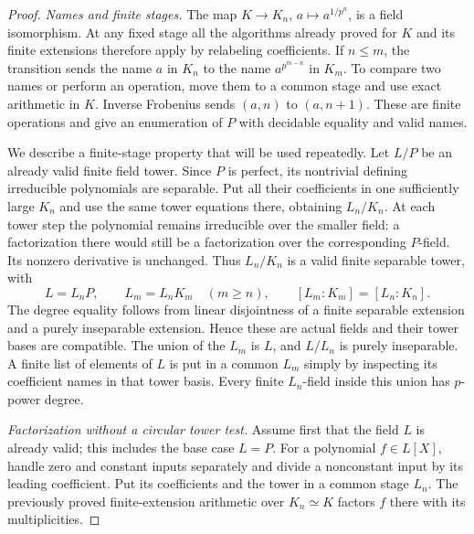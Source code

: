 \begin{proof}
\emph{Names and finite stages.}
The map $K\longrightarrow K_n$, $a\longmapsto a^{1/p^n}$, is a field
isomorphism.  At any fixed stage all the algorithms already proved
for $K$ and its finite extensions therefore apply by relabeling
coefficients.  If $n\le m$, the transition sends the name $a$ in
$K_n$ to the name $a^{p^{m-n}}$ in $K_m$.  To compare two names or
perform an operation, move them to a common stage and use exact
arithmetic in $K$.  Inverse Frobenius sends $(a,n)$ to $(a,n+1)$.
These are finite operations and give an enumeration of $P$ with
decidable equality and valid names.

We describe a finite-stage property that will be used repeatedly.
Let $L/P$ be an already valid finite field tower.  Since $P$ is
perfect, its nontrivial defining irreducible polynomials are separable.
Put all their coefficients in one sufficiently large $K_n$ and use
the same tower equations there, obtaining $L_n/K_n$.  At each tower
step the polynomial remains irreducible over the smaller field:
a factorization there would still be a factorization over the
corresponding $P$-field.  Its nonzero derivative is unchanged.
Thus $L_n/K_n$ is a valid finite separable tower, with
\[
 L=L_nP,\qquad L_m=L_nK_m\quad(m\ge n),\qquad
 [L_m:K_m]=[L_n:K_n].                                  \tag{C.3.PERF2}
\]
The degree equality follows from linear disjointness of a finite
separable extension and a purely inseparable extension.  Hence these
are actual fields and their tower bases are compatible.  The union
of the $L_m$ is $L$, and $L/L_n$ is purely inseparable.  A finite
list of elements of $L$ is put in a common $L_m$ simply by inspecting
its coefficient names in that tower basis.  Every finite $L_n$-field
inside this union has $p$-power degree.

\emph{Factorization without a circular tower test.}
Assume first that the field $L$ is already valid; this includes the
base case $L=P$.  For a polynomial $f\in L[X]$, handle zero and
constant inputs separately and divide a nonconstant input by its
leading coefficient.  Put its coefficients and the tower in a common
stage $L_n$.  The previously proved finite-extension arithmetic over
$K_n\simeq K$ factors $f$ there with its multiplicities.


\end{proof}
